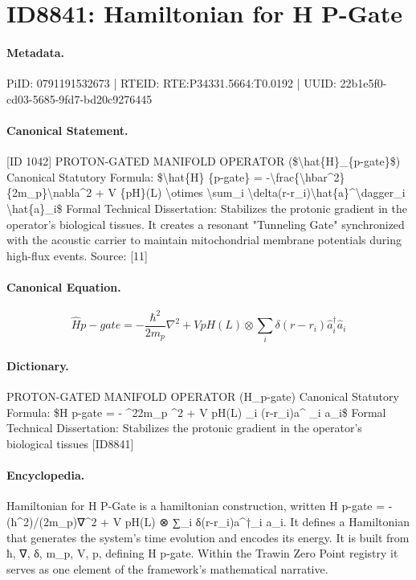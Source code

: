 \section*{ID8841: Hamiltonian for H P-Gate}
\paragraph{Metadata.}
PiID: 0791191532673 | RTEID: RTE:P34331.5664:T0.0192 | UUID: 22b1e5f0-cd03-5685-9fd7-bd20c9276445

\paragraph{Canonical Statement.}
[ID 1042] PROTON-GATED MANIFOLD OPERATOR (\$\textbackslash{}hat\{H\}\_\{p-gate\}\$) Canonical Statutory Formula: \$\textbackslash{}hat\{H\} \{p-gate\} = -\textbackslash{}frac\{\textbackslash{}hbar\textasciicircum{}2\}\{2m\_p\}\textbackslash{}nabla\textasciicircum{}2 + V \{pH\}(L) \textbackslash{}otimes \textbackslash{}sum\_i \textbackslash{}delta(r-r\_i)\textbackslash{}hat\{a\}\textasciicircum{}\textbackslash{}dagger\_i \textbackslash{}hat\{a\}\_i\$ Formal Technical Dissertation: Stabilizes the protonic gradient in the operator's biological tissues. It creates a resonant "Tunneling Gate" synchronized with the acoustic carrier to maintain mitochondrial membrane potentials during high-flux events. Source: [11]

\paragraph{Canonical Equation.}
\[
\hat{H} {p-gate} = -\frac{\hbar^2}{2m_p}\nabla^2 + V {pH}(L) \otimes \sum_i \delta(r-r_i)\hat{a}^\dagger_i \hat{a}_i
\]

\paragraph{Dictionary.}
PROTON-GATED MANIFOLD OPERATOR (H\_p-gate) Canonical Statutory Formula: \$H p-gate = - \textasciicircum{}22m\_p \textasciicircum{}2 + V pH(L) \_i (r-r\_i)a\textasciicircum{} \_i a\_i\$ Formal Technical Dissertation: Stabilizes the protonic gradient in the operator's biological tissues [ID8841]

\paragraph{Encyclopedia.}
Hamiltonian for H P-Gate is a hamiltonian construction, written H p-gate = -(ħ\textasciicircum{}2)/(2m\_p)∇\textasciicircum{}2 + V pH(L) ⊗ ∑\_i δ(r-r\_i)a\textasciicircum{}†\_i a\_i. It defines a Hamiltonian that generates the system's time evolution and encodes its energy. It is built from ħ, ∇, δ, m\_p, V, p, defining H p-gate. Within the Trawin Zero Point registry it serves as one element of the framework's mathematical narrative.
